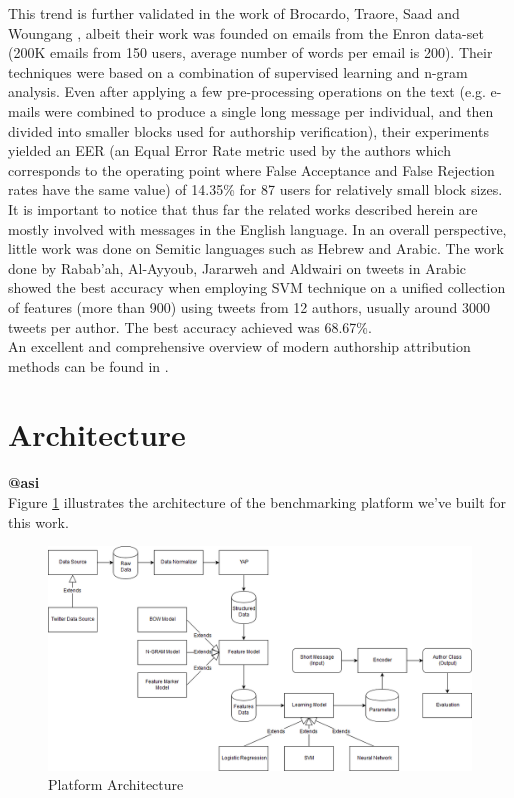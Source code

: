 \documentclass[a4paper]{article}
\begin{document}
This trend is further validated in the work of Brocardo, Traore, Saad and Woungang \cite{brocardo}, albeit their work was founded on emails from the Enron data-set (200K emails from 150 users, average number of words per email is 200). Their techniques were based on a combination of supervised learning and n-gram analysis. Even after applying a few pre-processing operations on the text (e.g. e-mails were combined to produce a single long message per individual, and then divided into smaller blocks used for authorship verification), their experiments yielded an EER (an Equal Error Rate metric used by the authors which corresponds to the operating point where False Acceptance and False Rejection rates have the same value) of 14.35\% for 87 users for relatively small block sizes.\\
It is important to notice that thus far the related works described herein are mostly involved with messages in the English language. In an overall perspective, little work was done on Semitic languages such as Hebrew and Arabic. The work done by Rabab’ah, Al-Ayyoub, Jararweh and Aldwairi \cite{rabab} on tweets in Arabic showed the best accuracy when employing SVM technique on a unified collection of features (more than 900) using tweets from 12 authors, usually around 3000 tweets per author. The best accuracy achieved was 68.67\%.\\
An excellent and comprehensive overview of modern authorship attribution methods can be found in \cite{stamatatos}.

\section{Architecture}
\label{Architecture}
\textbf{@asi}\\

Figure \ref{fig:architecture} illustrates the architecture of the benchmarking platform we've built for this work.\\
\begin{figure}[hb]
	\includegraphics[width=1\textwidth]{"architecture/NLP Author Classification Architecture"}
	\caption{Platform Architecture}
		\label{fig:architecture}
\end{figure}\\
\end{document}
